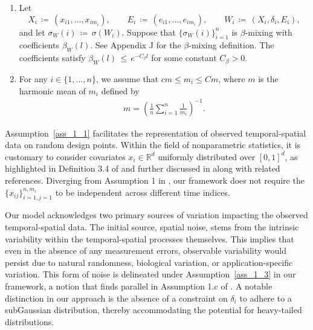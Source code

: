 \documentclass[twoside,11pt]{article}
\newcommand{\rev}[1]{{\color{revisionred}#1}}
\begin{document}
\begin{assumption}
\begin{enumerate}[label={\bfseries\arabic*.}, ref={\ref{Assumption 1.}.\arabic*}]
\item
\label{ass_c_beta}
\rev{Let
\[
X_i \,\coloneqq\, (x_{i1},\dots,x_{im_i}), \qquad
E_i \,\coloneqq\, (e_{i1},\dots,e_{im_i}), \qquad
W_i \,\coloneqq\, (X_i,\delta_i,E_i),
\]
and let $\sigma_W(i) \,\coloneqq\, \sigma(W_i)$. Suppose that
$\{\sigma_W(i)\}_{i=1}^n$ is $\beta$-mixing with coefficients
$\beta_W(l)$. See Appendix J for the $\beta$-mixing definition. The
coefficients satisfy $\beta_W(l) \,\leq\, e^{-C_\beta l}$ for some
constant $C_\beta>0$.}
\item \label{asm:m} For any $i \in \{1,...,n\}$, we assume that $cm \leq  m_i \leq  Cm$, where $m$ is the harmonic mean of $m_i$ defined by
\begin{align}
m = \left( \frac{1}{n} \sum_{i=1}^n \frac{1}{m_i} \right)^{-1}.
\end{align}    


\end{enumerate}
\end{assumption}

Assumption~\ref{ass_1_1} facilitates the representation of observed temporal-spatial data on random design points. Within the field of nonparametric statistics, it is customary to consider covariates \(x_i \in \mathbb{R}^d\) uniformly distributed over \([0,1]^d\), as highlighted in Definition 3.4 of \cite{gyorfi2002distribution} and further discussed in \cite{madrid2020adaptive} along with related references. \rev{Diverging from Assumption 1 in \cite{padilla2023temporal}, our framework does not require the \(\{x_{ij}\}_{i=1,j=1}^{n,m_i}\) to be independent across different time indices.}



Our model acknowledges two primary sources of variation impacting the observed temporal-spatial data. The initial source, spatial noise, stems from the intrinsic variability within the temporal-spatial processes themselves. This implies that even in the absence of any measurement errors, observable variability would persist due to natural randomness, biological variation, or application-specific variation. This form of noise is delineated under Assumption~\ref{ass_1_3} in our framework, a notion that finds parallel in Assumption 1.c of \cite{padilla2023temporal}. A notable distinction in our approach is the absence of a constraint on \(\delta_i\) to adhere to a subGaussian distribution, thereby accommodating the potential for heavy-tailed distributions.
\end{document}
